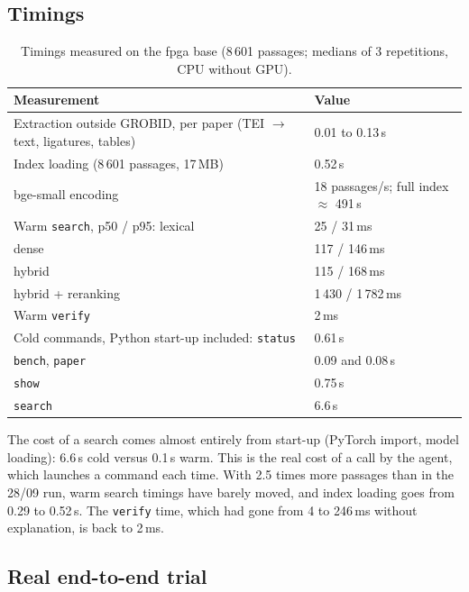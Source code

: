 \documentclass[11pt,a4paper]{article}
\newcommand{\cmd}[1]{\texttt{#1}}
\begin{document}
\subsection{Timings}

\begin{table}[ht]
\centering
\caption{Timings measured on the fpga base (8\,601 passages; medians of 3 repetitions, CPU
without GPU).}
\label{tab:temps}
\small
\begin{tabularx}{\linewidth}{@{}Ll@{}}
\toprule
Measurement & Value \\
\midrule
Extraction outside GROBID, per paper (TEI $\rightarrow$ text, ligatures, tables) & 0.01 to 0.13\,s \\
Index loading (8\,601 passages, 17\,MB) & 0.52\,s \\
bge-small encoding & 18 passages/s; full index $\approx$ 491\,s \\
Warm \cmd{search}, p50 / p95: lexical & 25 / 31\,ms \\
\quad dense & 117 / 146\,ms \\
\quad hybrid & 115 / 168\,ms \\
\quad hybrid + reranking & 1\,430 / 1\,782\,ms \\
Warm \cmd{verify} & 2\,ms \\
Cold commands, Python start-up included: \cmd{status} & 0.61\,s \\
\quad \cmd{bench}, \cmd{paper} & 0.09 and 0.08\,s \\
\quad \cmd{show} & 0.75\,s \\
\quad \cmd{search} & 6.6\,s \\
\bottomrule
\end{tabularx}
\end{table}

The cost of a search comes almost entirely from start-up (PyTorch import, model loading):
6.6\,s cold versus 0.1\,s warm. This is the real cost of a call by the agent, which launches
a command each time. With 2.5 times more passages than in the 28/09 run, warm search timings
have barely moved, and index loading goes from 0.29 to 0.52\,s. The \cmd{verify} time, which
had gone from 4 to 246\,ms without explanation, is back to 2\,ms.

\subsection{Real end-to-end trial}
\end{document}
